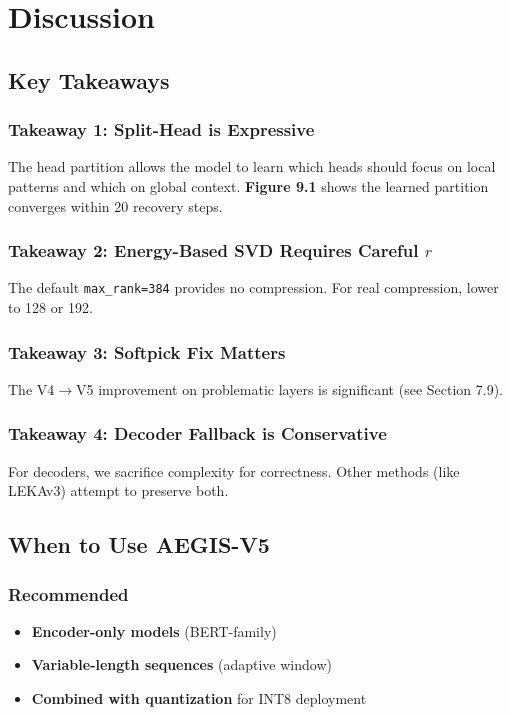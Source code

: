 \section{Discussion}

\subsection{Key Takeaways}

\subsubsection{Takeaway 1: Split-Head is Expressive}

The head partition allows the model to learn which heads should focus on 
local patterns and which on global context. \textbf{Figure 9.1} shows the 
learned partition converges within 20 recovery steps.

\subsubsection{Takeaway 2: Energy-Based SVD Requires Careful $r$}

The default \texttt{max\_rank=384} provides no compression. For real compression, 
lower to 128 or 192.

\subsubsection{Takeaway 3: Softpick Fix Matters}

The V4$\to$V5 improvement on problematic layers is significant (see Section 7.9).

\subsubsection{Takeaway 4: Decoder Fallback is Conservative}

For decoders, we sacrifice complexity for correctness. Other methods (like 
LEKAv3) attempt to preserve both.

\subsection{When to Use AEGIS-V5}

\subsubsection{Recommended}
\begin{itemize}
\item \textbf{Encoder-only models} (BERT-family)
\item \textbf{Variable-length sequences} (adaptive window)
\item \textbf{Combined with quantization} for INT8 deployment

\end{itemize}
